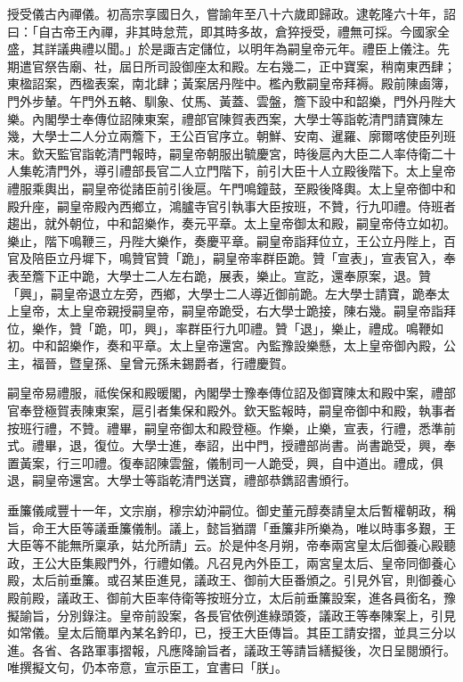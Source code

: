 \begin{pinyinscope}
授受儀古內禪儀。初高宗享國日久，嘗諭年至八十六歲即歸政。逮乾隆六十年，詔曰：「自古帝王內禪，非其時怠荒，即其時多故，倉猝授受，禮無可採。今國家全盛，其詳議典禮以聞。」於是諏吉定儲位，以明年為嗣皇帝元年。禮臣上儀注。先期遣官祭告廟、社，屆日所司設御座太和殿。左右幾二，正中寶案，稍南東西肆；東楹詔案，西楹表案，南北肆；黃案居丹陛中。檻內敷嗣皇帝拜褥。殿前陳鹵簿，門外步輦。午門外五輅、馴象、仗馬、黃蓋、雲盤，簷下設中和韶樂，門外丹陛大樂。內閣學士奉傳位詔陳東案，禮部官陳賀表西案，大學士等詣乾清門請寶陳左幾，大學士二人分立兩簷下，王公百官序立。朝鮮、安南、暹羅、廓爾喀使臣列班末。欽天監官詣乾清門報時，嗣皇帝朝服出毓慶宮，時後扈內大臣二人率侍衛二十人集乾清門外，導引禮部長官二人立門階下，前引大臣十人立殿後階下。太上皇帝禮服乘輿出，嗣皇帝從諸臣前引後扈。午門鳴鐘鼓，至殿後降輿。太上皇帝御中和殿升座，嗣皇帝殿內西鄉立，鴻臚寺官引執事大臣按班，不贊，行九叩禮。侍班者趨出，就外朝位，中和韶樂作，奏元平章。太上皇帝御太和殿，嗣皇帝侍立如初。樂止，階下鳴鞭三，丹陛大樂作，奏慶平章。嗣皇帝詣拜位立，王公立丹陛上，百官及陪臣立丹墀下，鳴贊官贊「跪」，嗣皇帝率群臣跪。贊「宣表」，宣表官入，奉表至簷下正中跪，大學士二人左右跪，展表，樂止。宣訖，還奉原案，退。贊「興」，嗣皇帝退立左旁，西鄉，大學士二人導近御前跪。左大學士請寶，跪奉太上皇帝，太上皇帝親授嗣皇帝，嗣皇帝跪受，右大學士跪接，陳右幾。嗣皇帝詣拜位，樂作，贊「跪，叩，興」，率群臣行九叩禮。贊「退」，樂止，禮成。鳴鞭如初。中和韶樂作，奏和平章。太上皇帝還宮。內監豫設樂懸，太上皇帝御內殿，公主，福晉，暨皇孫、皇曾元孫未錫爵者，行禮慶賀。

嗣皇帝易禮服，祗俟保和殿暖閣，內閣學士豫奉傳位詔及御寶陳太和殿中案，禮部官奉登極賀表陳東案，扈引者集保和殿外。欽天監報時，嗣皇帝御中和殿，執事者按班行禮，不贊。禮畢，嗣皇帝御太和殿登極。作樂，止樂，宣表，行禮，悉準前式。禮畢，退，復位。大學士進，奉詔，出中門，授禮部尚書。尚書跪受，興，奉置黃案，行三叩禮。復奉詔陳雲盤，儀制司一人跪受，興，自中道出。禮成，俱退，嗣皇帝還宮。大學士等詣乾清門送寶，禮部恭鐫詔書頒行。

垂簾儀咸豐十一年，文宗崩，穆宗幼沖嗣位。御史董元醇奏請皇太后暫權朝政，稱旨，命王大臣等議垂簾儀制。議上，懿旨猶謂「垂簾非所樂為，唯以時事多艱，王大臣等不能無所稟承，姑允所請」云。於是仲冬月朔，帝奉兩宮皇太后御養心殿聽政，王公大臣集殿門外，行禮如儀。凡召見內外臣工，兩宮皇太后、皇帝同御養心殿，太后前垂簾。或召某臣進見，議政王、御前大臣番頒之。引見外官，則御養心殿前殿，議政王、御前大臣率侍衛等按班分立，太后前垂簾設案，進各員銜名，豫擬諭旨，分別錄注。皇帝前設案，各長官依例進綠頭簽，議政王等奉陳案上，引見如常儀。皇太后簡單內某名鈐印，已，授王大臣傳旨。其臣工請安摺，並具三分以進。各省、各路軍事摺報，凡應降諭旨者，議政王等請旨繕擬後，次日呈閱頒行。唯撰擬文句，仍本帝意，宣示臣工，宜書曰「朕」。


\end{pinyinscope}

